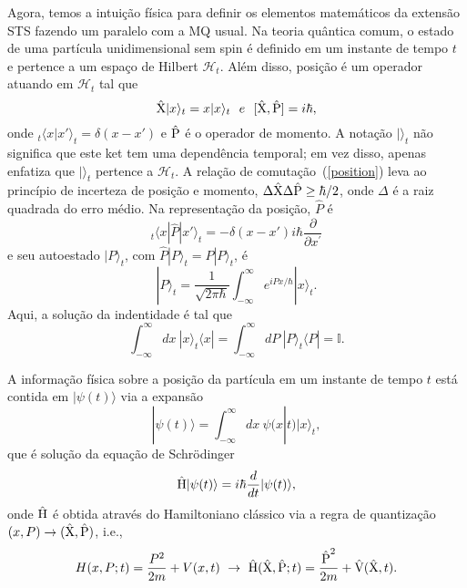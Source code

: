 Agora, temos a intuição física para definir os elementos matemáticos da extensão STS fazendo um paralelo com a MQ usual. Na teoria quântica comum, o estado de uma partícula unidimensional sem spin é definido em um instante de tempo $t$ e pertence a um espaço de Hilbert $\mathcal{H}_{t}$. Além disso, posição é um operador atuando em ${\mathcal H}_{t}$ tal que
\begin{equation}\label{position}
{\hat {\textrm X}} |x\rangle_{t}=x|x\rangle_{t}~~{ e}~~ [{\hat {\textrm X}},{\hat {\textrm P}}]=i\hbar,
\end{equation}
onde ${_{t}\langle} x|x' \rangle_t=\delta (x-x')$ e ${\hat {\textrm P}}$ é o operador de momento. A notação $|\rangle_t$ não significa que este ket tem uma dependência temporal; em vez disso, apenas enfatiza que $|\rangle_t$ pertence a ${\mathcal H}_t$. A relação de comutação~(\ref{position}) leva ao princípio de incerteza de posição e momento, $\Delta {\hat {\textrm X}} \Delta {\hat {\textrm P}} \geq \hbar/2 $, onde $\Delta$ é a raiz quadrada do erro médio. Na representação da posição, $\hat P$ é
\begin{equation}\label{momentum}
{_t\langle } x|{\hat { P}}| x' \rangle_t=- \delta(x-x') i\hbar \frac{\partial}{\partial x^\prime} 
\end{equation}
e seu autoestado $|P\rangle_t$, com ${\hat P}|P\rangle_t= P |P\rangle_t$, é
\begin{equation}\label{autoestadoP}
|P\rangle_{t}=\frac{1}{\sqrt{2\pi \hbar}} \int_{-\infty}^{\infty} e^{iPx/\hbar} |x\rangle_{t}.
\end{equation}
Aqui, a solução da indentidade é tal que
\begin{equation}\label{identityX}
\int_{-\infty}^{\infty} dx ~|x\rangle_t \langle x|=\int_{-\infty}^{\infty} dP~ |P\rangle_t\langle P|= \mathbb{I}.
\end{equation}

A informação física sobre a posição da partícula em um instante de tempo $t$ está contida em $|\psi(t)\rangle$ via a expansão
\begin{equation}\label{expansionX}
|{\psi(t)} \rangle=\int_{-\infty}^{\infty} dx~ \psi(x|t) |x\rangle_t,
\end{equation}
que é solução da equação de Schrödinger
\begin{equation}\label{Schro}
{\hat {\textrm H}}|{\psi(t)} \rangle=i\hbar \frac{d}{dt}|{\psi(t)} \rangle,
\end{equation}
onde ${\hat {\textrm H}}$ é obtida através do Hamiltoniano clássico via a regra de quantização $(x,P) \rightarrow ({\hat {\textrm X}},{\hat {\textrm P}})$, i.e.,
\begin{equation}\label{ruleX}
H(x,P;t)=\frac{P^2}{2m}+V(x,t) ~ \rightarrow ~ {\hat {\textrm H}}({\hat {\textrm X}},{\hat {\textrm P}};t)=\frac{{\hat {\textrm P}}^2}{2m}+{\hat {\textrm V}}({\hat {\textrm X}},t).
\end{equation}


